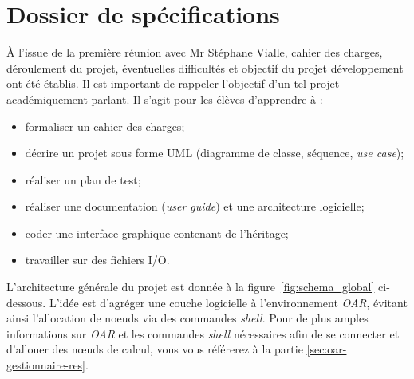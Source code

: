 \section{Dossier de spécifications}

\par À l’issue de la première réunion avec Mr Stéphane Vialle, cahier des charges, déroulement du projet, éventuelles difficultés et objectif du projet développement ont été établis. Il est important de rappeler l'objectif d'un tel projet académiquement parlant. Il s'agit pour les élèves d'apprendre à :

\begin{itemize}
\item formaliser un cahier des charges;
\item décrire un projet sous forme UML (diagramme de classe, séquence, \emph{use case});
\item réaliser un plan de test;
\item réaliser une documentation (\emph{user guide}) et une architecture logicielle;
\item coder une interface graphique contenant de l’héritage;
\item travailler sur des fichiers I/O.
\end{itemize}

\par L’architecture générale du projet est donnée à la figure~\ref{fig:schema_global} ci-dessous. L’idée est d’agréger une couche logicielle à l’environnement \emph{OAR}, évitant ainsi l'allocation de noeuds via des commandes \emph{shell}.  Pour de plus amples informations sur \emph{OAR} et les commandes \emph{shell} nécessaires afin de se connecter et d’allouer des nœuds de calcul, vous vous référerez à la partie \ref{sec:oar-gestionnaire-res}.

